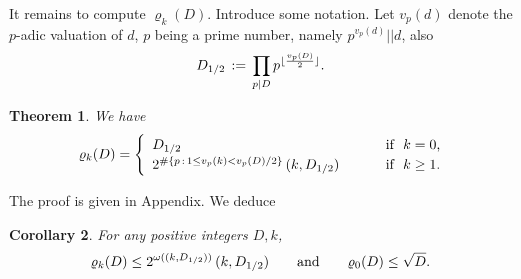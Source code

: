 \documentclass[11pt,draft,reqno]{amsart}
\newtheorem{theorem}{Theorem}[section]
\newtheorem{corollary}[theorem]{Corollary}
\theoremstyle{definition}
\theoremstyle{remarks}
\numberwithin{equation}{section}
\def \d{{\delta}}
\def \o{{\omega}}
\def \p{{\varphi}}
\def \qq{{\qquad}}
\def\E{{\mathbb E \,}}
\begin{document}
 
 It remains to compute   $\varrho_k(D)$.
  Introduce some   notation. Let   $v_p(d)$ denote the $p$-adic valuation of $d$, $p$ being a prime number, namely $p^{v_p(d)} || d$,   also \begin{eqnarray}\label{D.demi}D_{1/2} \,:=\,\prod_{p|D} p^{\lfloor {v_p(D)\over 2}\rfloor }. 
\end{eqnarray}

\begin{theorem} \label{romult1}   We have  
  \begin{equation*} \varrho_k(D)=\begin{cases}  \  \,
D_{1/2}\qq & \hbox{ if \ $k=0$,}\cr
\  \, 2^{\#\{p\,:\, 1\le v_p(k)<v_p(D)/2 \}}\, (k, D_{1/2})\qq &\hbox{ if \ $k\ge 1$.}
\end{cases}
\end{equation*}
     \end{theorem}
  
The proof is given in Appendix. 
We deduce
\begin{corollary}\label{rokest} For any positive integers  $D,k$,   
$$\varrho_k(D)\le 2^{\o ((k, D_{1/2}))}\, (k, D_{1/2})
 \qq
  {\rm and}\qq
\varrho_0(D)\le  
\sqrt D.
$$   
\end{corollary}  
\end{document}
